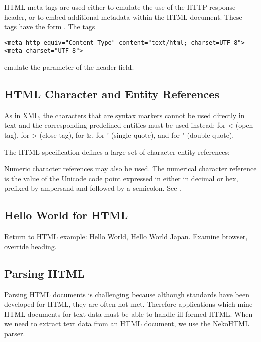 HTML meta-tags are used either to emulate the use of the HTTP response header, 
or to embed additional metadata within the HTML document.
These tags have the form .
The tags
\begin{verbatim}
<meta http-equiv="Content-Type" content="text/html; charset=UTF-8">
<meta charset="UTF-8">
\end{verbatim}
emulate the  parameter of the  header field.

\subsection{HTML Character and Entity References}

As in XML, the characters that are syntax markers cannot be used directly
in text and the corresponding predefined entities must be used instead:
 for < (open tag),  for > (close tag),  for \&,
 for ' (single quote), and  for " (double quote).

The HTML specification defines a large set of character entity references:

Numeric character references may also be used.
The numerical character reference is the value of the Unicode code point
expressed in either in decimal or hex, 
prefixed by ampersand and followed by a semicolon.
See .

\subsection{Hello World for HTML}

Return to HTML example:  Hello World, Hello World Japan.
Examine browser, override heading.

\subsection{Parsing HTML}

Parsing HTML documents is challenging because although standards
have been developed for HTML, they are often not met.
Therefore applications which mine HTML documents for text data
must be able to handle ill-formed HTML.
When we need to extract text data from an HTML document,
we use the NekoHTML parser.

